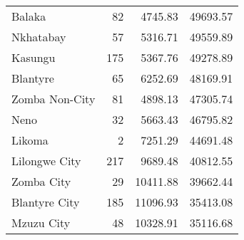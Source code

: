 \begin{tabular}{lrrr}
Balaka         &      82 &        4745.83 &            49693.57 \\
Nkhatabay      &      57 &        5316.71 &            49559.89 \\
Kasungu        &     175 &        5367.76 &            49278.89 \\
Blantyre       &      65 &        6252.69 &            48169.91 \\
Zomba Non-City &      81 &        4898.13 &            47305.74 \\
Neno           &      32 &        5663.43 &            46795.82 \\
Likoma         &       2 &        7251.29 &            44691.48 \\
Lilongwe City  &     217 &        9689.48 &            40812.55 \\
Zomba City     &      29 &       10411.88 &            39662.44 \\
Blantyre City  &     185 &       11096.93 &            35413.08 \\
Mzuzu City     &      48 &       10328.91 &            35116.68 \\
\bottomrule
\end{tabular}
